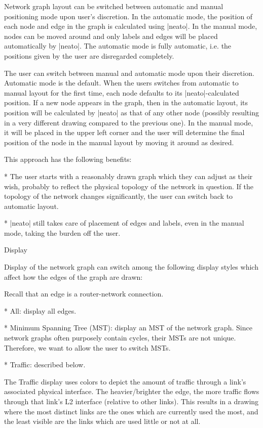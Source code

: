 Network graph layout can be switched between automatic and manual positioning
mode upon user's discretion. In the automatic mode, the position of each node
and edge in the graph is calculated using |neato|. In the manual mode, nodes
can be moved around and only labels and edges will be placed automatically by
|neato|. The automatic mode is fully automatic, i.e. the positions given by the
user are disregarded completely.

The user can switch between manual and automatic mode upon their discretion.
Automatic mode is the default. When the users switches from automatic to manual
layout for the first time, each node defaults to its |neato|-calculated
position.  If a new node appears in the graph, then in the automatic layout, its
position will be calculated by |neato| as that of any other node (possibly
resulting in a very different drawing compared to the previous one). In the
manual mode, it will be placed in the upper left corner and the user will
determine the final position of the node in the manual layout by moving it
around as desired.

This approach has the following benefits:

\begitems

* The user starts with a reasonably drawn graph which they can adjust as their
wish, probably to reflect the physical topology of the network in question.  If
the topology of the network changes significantly, the user can switch back to
automatic layout.

* |neato| still takes care of placement of edges and labels, even in the manual
mode, taking the burden off the user.

\enditems

\secc Display

Display of the network graph can switch among the following display styles which
affect how the edges of the graph are drawn:

Recall that an edge is a router-network connection.

\begitems

* All: display all edges.

* Minimum Spanning Tree (MST): display an MST of the network graph. Since network
graphs often purposely contain cycles, their MSTs are not unique. Therefore, we
want to allow the user to switch MSTs.

* Traffic: described below.

\enditems

The Traffic display uses colors to depict the amount of traffic through a
link's associated physical interface. The heavier/brighter the edge, the more
traffic flows through that link's L2 interface (relative to other links). This
results in a drawing where the most distinct links are the ones which are
currently used the most, and the least visible are the links which are used
little or not at all.

